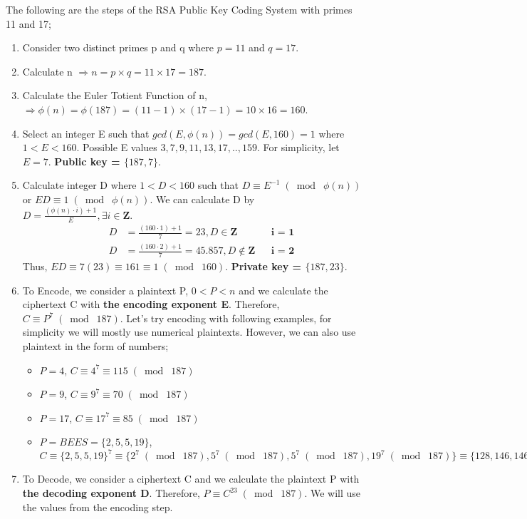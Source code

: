 \documentclass{article}
\begin{document}
The following are the steps of the RSA Public Key Coding System with primes 11 and 17;
\begin{enumerate}
    \item Consider two distinct primes p and q where $p = 11$ and $q = 17$. 
    \item Calculate n $\Longrightarrow n = p \times q = 11 \times 17 = 187$.
    \item Calculate the Euler Totient Function of n, $\Longrightarrow \phi(n) = \phi(187) = (11-1) \times (17-1) = 10 \times 16 = 160$.
    \item Select an integer E such that $gcd(E, \phi(n)) = gcd(E, 160) = 1$ where $1 < E < 160$. Possible E values $3,7,9,11,13,17,..,159$. For simplicity, let $E = 7$. \textbf{Public key = $\{187, 7\}$}.
    \item Calculate integer D where $1 < D < 160$ such that $D \equiv E^{-1} \;(\bmod\; \phi(n))$ or $ED \equiv 1 \;(\bmod\; \phi(n))$. We can calculate D by $D = \frac{(\phi(n) \cdot i) + 1}{E}, \exists i \in \mathbf{Z}$.
    \begin{align*}
        &&D &= \frac{(160 \cdot 1) + 1}{7} = 23, D \in \mathbf{Z} && \textbf{i = 1}\\
        &&D &= \frac{(160 \cdot 2) + 1}{7} = 45.857, D \not\in \mathbf{Z} && \textbf{i = 2}
    \end{align*}
    Thus, $ED \equiv 7(23) \equiv 161 \equiv 1 \;(\bmod\; 160)$. \textbf{Private key = $\{187, 23\}$}.
    \item To Encode, we consider a plaintext P, $0 < P < n$ and we calculate the ciphertext C with \textbf{the encoding exponent E}. Therefore, $C \equiv P^{7} \;(\bmod\; 187)$. Let's try encoding with following examples, for simplicity we will mostly use numerical plaintexts. However, we can also use plaintext in the form of numbers;
    \begin{itemize}
        \item $P = 4$, $C \equiv 4^{7} \equiv 115 \;(\bmod\; 187)$
        \item $P = 9$, $C \equiv 9^{7} \equiv 70 \;(\bmod\; 187)$
        \item $P = 17$, $C \equiv 17^{7} \equiv 85 \;(\bmod\; 187)$
        \item $P = BEES = \{2, 5, 5, 19\}$, $C \equiv \{2, 5, 5, 19\}^{7} \equiv \{2^7 \;(\bmod\; 187), 5^7 \;(\bmod\; 187), 5^7 \;(\bmod\; 187), 19^7 \;(\bmod\; 187)\} \equiv \{128, 146, 146, 145\} \;(\bmod\; 187)$
    \end{itemize}
    \item To Decode, we consider a ciphertext C and we calculate the plaintext P with \textbf{the decoding exponent D}. Therefore, $P \equiv C^{23} \;(\bmod\; 187)$. We will use the values from the encoding step.

\end{enumerate}
\end{document}
